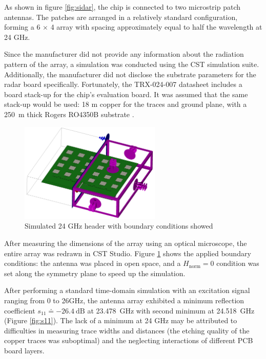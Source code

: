 As shown in figure \ref{fig:sidar}, the chip is connected to two microstrip patch antennas.
The patches are arranged in a relatively standard configuration, forming a 6 $\times$ 4 array with spacing approximately equal to half the wavelength at 24 GHz.

Since the manufacturer did not provide any information about the radiation pattern of the array, a simulation was conducted using the CST simulation suite.
Additionally, the manufacturer did not disclose the substrate parameters for the radar board specifically.
Fortunately, the TRX-024-007 datasheet includes a board stack-up for the chip's evaluation board.
It was assumed that the same stack-up would be used: 18 \textmu m copper for the traces and ground plane, with a 250~\textmu m thick Rogers RO4350B substrate \cite{sidarTRX24}.

\begin{figure}[ht!]
  \centering
  \includegraphics[width=0.6\textwidth]{../img/boundaries.png}
  \caption[Simulated 24 GHz header with boundary conditions showed]{Simulated 24 GHz header with boundary conditions showed}
  \label{fig:boundaries}
\end{figure}

After measuring the dimensions of the array using an optical microscope, the entire array was redrawn in CST Studio.
Figure \ref{fig:boundaries} shows the applied boundary conditions: the antenna was placed in open space, and a  $H_\mathrm{norm}=0$ condition was set along the symmetry plane to speed up the simulation.

After performing a standard time-domain simulation with an excitation signal ranging from 0 to 26GHz, the antenna array exhibited a minimum reflection coefficient $s_{11} \doteq -26.4 \mathrm{~dB}$ at 23.478~GHz with second minimum at 24.518~GHz (Figure \ref{fig:s11}).
The lack of a minimum at 24 GHz may be attributed to difficulties in measuring trace widths and distances (the etching quality of the copper traces was suboptimal) and the neglecting interactions of different PCB board layers.

